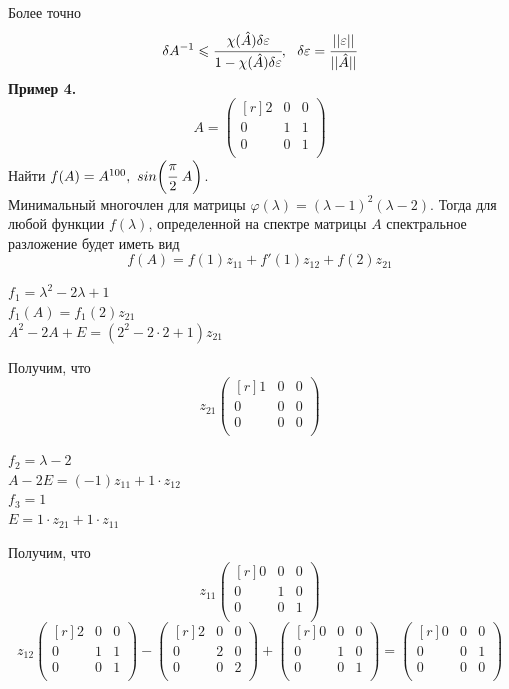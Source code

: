 \documentclass[12pt]{article}
\theoremstyle{definition}
\numberwithin{equation}{section}
\begin{document}
	Более точно $$\delta A^{-1}\leqslant \cfrac{\chi(\hat A)\delta \varepsilon}{1-\chi(\hat A)\delta \varepsilon},~~\delta \varepsilon=\cfrac{||\varepsilon||}{||\hat A||}$$
	\textbf{Пример 4.}\\
	\[A=\begin{pmatrix}[r]
	2 & 0 & 0 \\
	0 & 1 & 1 \\
	0 & 0 & 1 \\
	\end{pmatrix}\]
	Найти $f(A)=A^{100},~ sin\bigg(\cfrac{\pi}{2}~A\bigg)$.\\
	Минимальный многочлен для матрицы $\varphi(\lambda)=(\lambda-1)^2(\lambda-2)$. Тогда для любой функции $f(\lambda)$, определенной на спектре матрицы $A$ спектральное разложение будет иметь вид $$f(A)=f(1)z_{11}+f'(1)z_{12}+f(2)z_{21}$$
	\begin{center}
		$f_1=\lambda^2-2\lambda+1$\\
		$f_1(A)=f_1(2)z_{21}$\\
		$A^2-2A+E=(2^2-2\cdot 2+1)z_{21}$
	\end{center}
	Получим, что \[z_{21}\begin{pmatrix}[r]
	1 & 0 & 0 \\
	0 & 0 & 0 \\
	0 & 0 & 0 \\
	\end{pmatrix}\]
	\begin{center}
		$f_2=\lambda-2$\\
		$A-2E=(-1)z_{11}+1\cdot z_{12}$\\
		$f_3=1$\\
		$E=1\cdot z_{21}+1\cdot z_{11}$
	\end{center}
	Получим, что \[z_{11}\begin{pmatrix}[r]
	0 & 0 & 0 \\
	0 & 1 & 0 \\
	0 & 0 & 1 \\
	\end{pmatrix}\]
	\[z_{12}\begin{pmatrix}[r]
	2 & 0 & 0 \\
	0 & 1 & 1 \\
	0 & 0 & 1 \\
	\end{pmatrix} - \begin{pmatrix}[r]
	2 & 0 & 0 \\
	0 & 2 & 0 \\
	0 & 0 & 2 \\
	\end{pmatrix} + \begin{pmatrix}[r]
	0 & 0 & 0 \\
	0 & 1 & 0 \\
	0 & 0 & 1 \\
	\end{pmatrix} = \begin{pmatrix}[r]
	0 & 0 & 0 \\
	0 & 0 & 1 \\
	0 & 0 & 0 \\
	\end{pmatrix}\]
\end{document}
